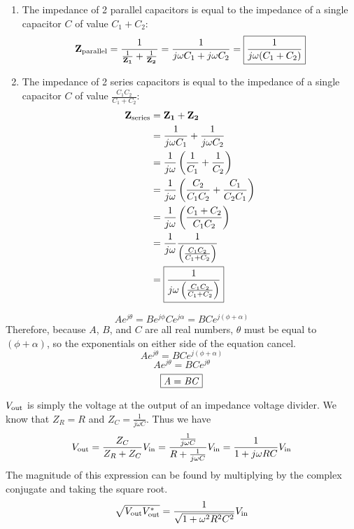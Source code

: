 \begin{enumerate}
    \item
    The impedance of 2 parallel capacitors is equal to the impedance of a single capacitor $C$ of value $C_1 + C_2$:
    \[ \mathbf{Z_\text{parallel}} = \frac{1}{ \frac{1}{\mathbf{Z_1}} + \frac{1}{\mathbf{Z_2}} } = \frac{1}{ j\omega C_1 + j\omega C_2 } = \boxed{\frac{1}{j\omega (C_1 + C_2)}} \]
    
    \item
    The impedance of 2 series capacitors is equal to the impedance of a single capacitor $C$ of value $\frac{C_1 C_2}{C_1 + C_2}$:
    \begin{align*}
        \mathbf{Z_{\text{series}}} &= \mathbf{Z_1} + \mathbf{Z_2} \\
        &=  \frac{1}{j\omega C_1} + \frac{1}{j\omega C_2} \\
        &= \frac{1}{j\omega} \left( \frac{1}{C_1} + \frac{1}{C_2} \right) \\
        &= \frac{1}{j\omega} \left( \frac{C_2}{C_1 C_2} + \frac{C_1}{C_2 C_1} \right) \\
        &= \frac{1}{j\omega} \left( \frac{C_1 + C_2}{C_1 C_2} \right) \\
        &= \frac{1}{j\omega} \frac{1}{\left( \frac{C_1 C_2}{C_1 + C_2} \right)} \\
        &= \boxed{ \frac{1}{j\omega\left( \frac{C_1 C_2}{C_1 + C_2} \right)}}
    \end{align*}
\end{enumerate}

\[ A e^{j\theta} = B e^{j\phi}C e^{j\alpha} = BC e^{j\left(\phi + \alpha\right)}\]
Therefore, because $A$, $B$, and $C$ are all real numbers, $\theta$ must be equal to $(\phi + \alpha)$, so the exponentials on either side of the equation cancel.
\[A e^{j\theta} =  BC e^{j\left(\phi + \alpha\right)}\]
\[A e^{j\theta} = BC e^{j\theta}\]
\[\boxed{\textnormal{\textit{A}} = \textnormal{\textit{BC}}}\]




$V_{\text{out}}$ is simply the voltage at the output of an impedance voltage divider. We know that $Z_R = R$ and $Z_C = \frac{1}{j\omega C}$. Thus we have 
\[V_{\text{out}} = \frac{Z_C}{Z_R + Z_C} V_{\text{in}} = \frac{\frac{1}{j \omega C}}{R + \frac{1}{j \omega C}} V_{\text{in}} = \frac{1}{1 + j \omega R C} V_{\text{in}}\]
The magnitude of this expression can be found by multiplying by the complex conjugate and taking the square root.
\[\sqrt{V_{\text{out}} V_{\text{out}}^*} = \frac{1}{\sqrt{1 + \omega^2R^2C^2}}V_{\text{in}}\]

